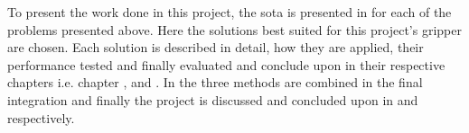 To present the work done in this project, the \gls{sota} is presented in  for each of the problems presented above. Here the solutions best suited for this project's gripper are chosen. Each solution is described in detail, how they are applied, their performance tested and finally evaluated and conclude upon in their respective chapters i.e. chapter ,  and . In  the three methods are combined in the final integration and finally the project is discussed and concluded upon in  and  respectively.





































